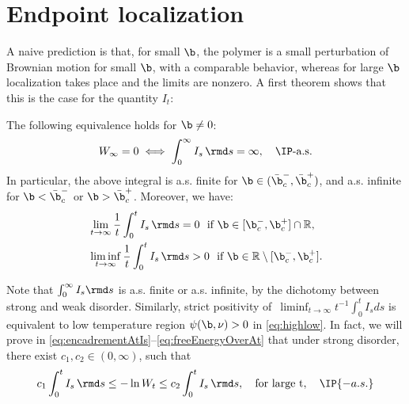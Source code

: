 \section{Endpoint localization}
%
A naive prediction is  that, for small $\b$,  the polymer is a small perturbation of Brownian motion for small $\b$, with a comparable behavior, whereas  for large $\b$ localization takes place and the limits are nonzero.
A first theorem shows that this is the case for the quantity $I_t$:
\begin{theorem} \label{th:loca} The following equivalence holds for $\b \neq 0$:
\begin{equation} \label{eq:intIsEqSD}
W_\infty = 0 \iff \int_0^\infty I_s \, \rmd s = \infty, \quad \IP\text{-a.s.}
\end{equation}
In particular, the above integral is a.s. finite for $\b \in (\bar{\b}_c^-, \bar{\b}_c^+)$, and a.s. infinite for $\b < \bar{\b}_c^-$ or $\b > \bar{\b}_c^+$.
Moreover, we have: 
\begin{align} 
&\lim_{t\to\infty} \frac{1}{t} \int_0^t I_s \, \rmd s = 0 \  \textup{ if } \b \in [\b_c^-,\b_c^+]\cap \mathbb{R},\label{eq:AsymptIntIs1}\\
&\liminf_{t\to\infty} \frac{1}{t} \int_0^t I_s \, \rmd s > 0 \  \textup{ if } \b \in \mathbb{R}\setminus [\b_c^-,\b_c^+]. \label{eq:AsymptIntIs2}
\end{align}
\end{theorem}
\begin{remark} Note that  $\int_0^\infty I_s \rmd s$ is a.s. finite or a.s. infinite,  by the dichotomy between strong and weak disorder. Similarly, 
strict positivity of $\,\liminf_{t\to\infty} t^{-1} \int_0^t I_s ds$  is equivalent to low temperature region $\psi(\b, \nu)>0$ in \eqref{eq:highlow}.
In fact, we will prove
in \eqref{eq:encadrementAtIs}--\eqref{eq:freeEnergyOverAt}
 that under strong disorder, there exist $c_1,c_2 \in (0,\infty)$, such that
\begin{equation} \label{eq:EncadrementFreeEnergy}
c_1 \int_0^t I_s \, \rmd s \leq  - \ln W_t \leq c_2 \int_0^t I_s \, \rmd s, \quad \text{for large t}, \quad \IP{-a.s.}
\end{equation}
\end{remark}
